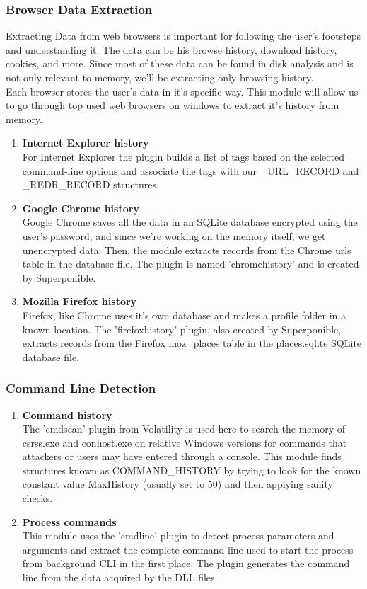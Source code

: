 \subsubsection{Browser Data Extraction}
Extracting Data from web browsers is important for following the user's footsteps and understanding it. The data can be his browse history, download history, cookies, and more. Since most of these data can be found in disk analysis and is not only relevant to memory, we'll be extracting only browsing history.\\
Each browser stores the user's data in it's specific way. This module will allow us to go through top used web browsers on windows to extract it's history from memory.
\begin{enumerate}[label=(\alph*)]
    \item \textbf{Internet Explorer history}\\
    For Internet Explorer the plugin builds a list of tags based on the selected command-line options and associate the tags with our \_URL\_RECORD and \_REDR\_RECORD structures.
    \item \textbf{Google Chrome history}\\
    Google Chrome saves all the data in an SQLite database encrypted using the user's password, and since we're working on the memory itself, we get unencrypted data. Then, the module extracts records from the Chrome urls table in the database file. The plugin is named 'chromehistory' and is created by Superponible\cite{superponible}.
    \item \textbf{Mozilla Firefox history}\\
    Firefox, like Chrome uses it's own database and makes a profile folder in a known location. The 'firefoxhistory' plugin, also created by Superponible, extracts records from the Firefox moz\_places table in the places.sqlite SQLite database file.
\end{enumerate}

\subsubsection{Command Line Detection}
\begin{enumerate}[label=(\alph*)]
    \item \textbf{Command history}\\
    The 'cmdscan' plugin from Volatility is used here to search the memory of csrss.exe and conhost.exe on relative Windows versions for commands that attackers or users may have entered through a console. This module finds structures known as COMMAND\_HISTORY by trying to look for the known constant value MaxHistory (usually set to 50) and then applying sanity checks.
    \item \textbf{Process commands}\\
    This module uses the 'cmdline' plugin to detect process parameters and arguments and extract the complete command line used to start the process from background CLI in the first place. The plugin generates the command line from the data acquired by the DLL files.
\end{enumerate}


